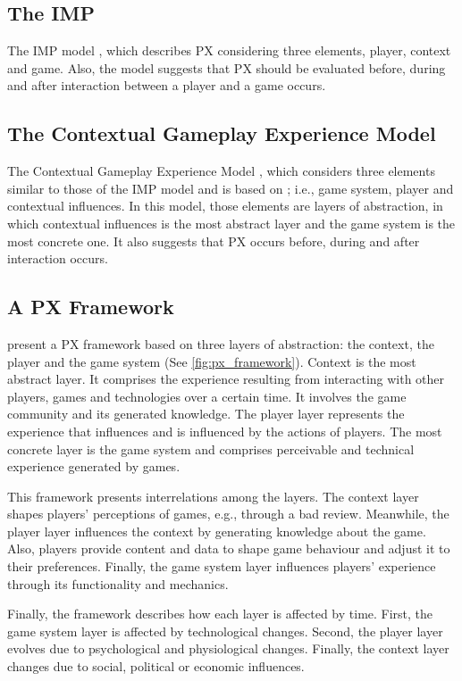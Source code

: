\subsection{The \ac{IMP}}
The \ac{IMP} model \autocite{Elson2014}, which describes \ac{PX} considering three elements, player, context and game. Also, the model suggests that \ac{PX} should be evaluated before, during and after interaction between a player and a game occurs.

\subsection{The Contextual Gameplay Experience Model}
The Contextual Gameplay Experience Model \autocite{Engl2013}, which considers three elements similar to those of the \ac{IMP} model and is based on \autocite{Nackea2,Nacked}; i.e., game system, player and contextual influences. In this model, those elements are layers of abstraction, in which contextual influences is the most abstract layer and the game system is the most concrete one. It also suggests that \ac{PX} occurs before, during and after interaction occurs.

\subsection{A PX Framework}
\textcite{Nackea2} present a \ac{PX} framework based on three layers of abstraction: the context, the player and the game system (See \autoref{fig:px_framework}). Context is the most abstract layer. It comprises the experience resulting from interacting with other players, games and technologies over a certain time. It involves the game community and its generated knowledge. The player layer represents the experience that influences and is influenced by the actions of players. The most concrete layer is the game system and comprises perceivable and technical experience generated by games.

This framework presents interrelations among the layers. The context layer shapes players' perceptions of games, e.g., through a bad review. Meanwhile, the player layer influences the context by generating knowledge about the game. Also, players provide content and data to shape game behaviour and adjust it to their preferences. Finally, the game system layer influences players' experience through its functionality and mechanics.

Finally, the framework describes how each layer is affected by time. First, the game system layer is affected by technological changes. Second, the player layer evolves due to psychological and physiological changes. Finally, the context layer changes due to social, political or economic influences.

